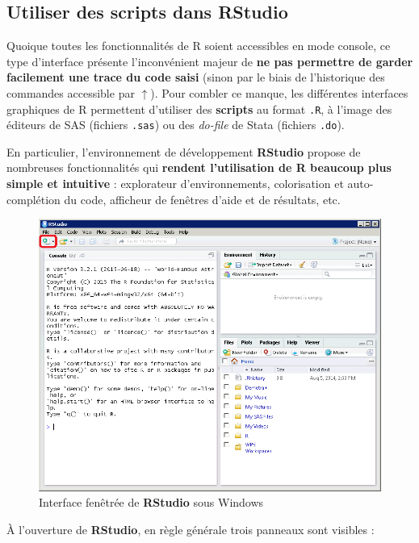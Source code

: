 \documentclass[12pt,twosided, notitlepage]{book}
\begin{document}
\subsection{Utiliser des scripts dans
RStudio}\label{utiliser-des-scripts-dans-rstudio}

Quoique toutes les fonctionnalités de R soient accessibles en mode
console, ce type d'interface présente l'inconvénient majeur de
\textbf{ne pas permettre de garder facilement une trace du code saisi}
(sinon par le biais de l'historique des commandes accessible par
\(\uparrow\)). Pour combler ce manque, les différentes interfaces
graphiques de R permettent d'utiliser des \textbf{scripts} au format
\texttt{.R}, à l'image des éditeurs de SAS (fichiers \texttt{.sas}) ou
des \emph{do-file} de Stata (fichiers \texttt{.do}).

En particulier, l'environnement de développement \textbf{RStudio}
propose de nombreuses fonctionnalités qui \textbf{rendent l'utilisation
de R beaucoup plus simple et intuitive} : explorateur d'environnements,
colorisation et auto-complétion du code, afficheur de fenêtres d'aide et
de résultats, etc.

\begin{figure}[htbp]
\centering
\includegraphics{../figures/Interface_RStudio_1.png}
\caption{Interface fenêtrée de \textbf{RStudio} sous Windows}
\end{figure}

À l'ouverture de \textbf{RStudio}, en règle générale trois panneaux sont
visibles :
\end{document}
